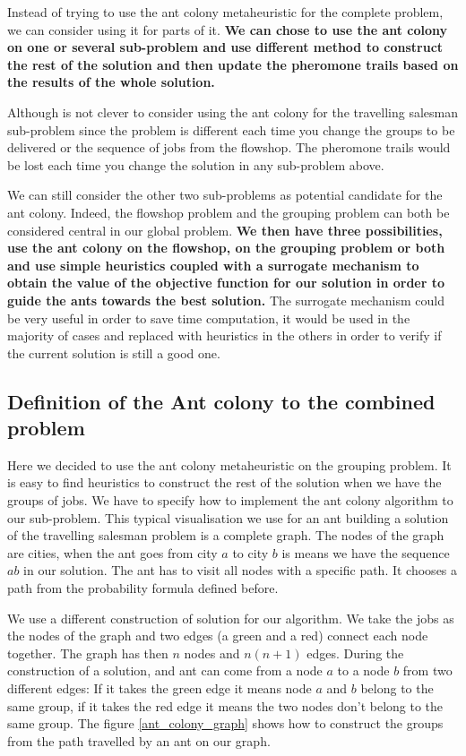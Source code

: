 \documentclass[UTF8, twoside]{EPURapport}
\begin{document}
	Instead of trying to use the ant colony metaheuristic for the complete problem, we can consider using it for parts of it. \textbf{We can chose to use the ant colony on one or several sub-problem and use different method to construct the rest of the solution and then update the pheromone trails based on the results of the whole solution.} 
	
	Although is not clever to consider using the ant colony for the travelling salesman sub-problem since the problem is different each time you change the groups to be delivered or the sequence of jobs from the flowshop. The pheromone trails would be lost each time you change the solution in any sub-problem above.
	
	We can still consider the other two sub-problems as potential candidate for the ant colony. Indeed, the flowshop problem and the grouping problem can both be considered central in our global problem. \textbf{We then have three possibilities, use the ant colony on the flowshop, on the grouping problem or both and use simple heuristics coupled with a surrogate mechanism to obtain the value of the objective function for our solution in order to guide the ants towards the best solution.} The surrogate mechanism could be very useful in order to save time computation, it would be used in the majority of cases and replaced with heuristics in the others in order to verify if the current solution is still a good one.
\\	

\subsection{Definition of the Ant colony to the combined problem}
	
	Here we decided to use the ant colony metaheuristic on the grouping problem. It is easy to find heuristics to construct the rest of the solution when we have the groups of jobs. We have to specify how to implement the ant colony algorithm to our sub-problem. This typical visualisation we use for an ant building a solution of the travelling salesman problem is a complete graph. The nodes of the graph are cities, when the ant goes from city $a$ to city $b$ is means we have the sequence $ab$ in our solution. The ant has to visit all nodes with a specific path. It chooses a path from the probability formula defined before.
	
	We use a different construction of solution for our algorithm. We take the jobs as the nodes of the graph and two edges (a green and a red) connect each node together. The graph has then $n$ nodes and $n(n+1)$ edges. During the construction of a solution, and ant can come from a node $a$ to a node $b$ from two different edges: If it takes the green edge it means node $a$ and $b$ belong to the same group, if it takes the red edge it means the two nodes don't belong to the same group. The figure \ref{ant_colony_graph} shows how to construct the groups from the path travelled by an ant on our graph.
\\
\end{document}
